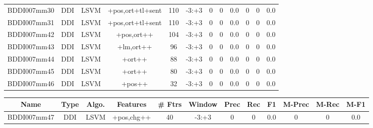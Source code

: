 \documentclass[a4paper]{article}
\begin{document}
\begin{landscape}
\begin{center}
\begin{tabular}{ |c|c|c|c|c|c|c|c|c|c|c|c|}
 
 	
 	\small{ BDDI007mm30 } & \small{ DDI} & \small{  LSVM }  & +pos,ort+tl+sent  &  110 &  \small{  -3:+3 }  &  0 & 0 & 0.0  &  0 & 0 & 0.0 \\
 	

 
 	
 	\small{ BDDI007mm31 } & \small{ DDI} & \small{  LSVM }  & +pos,ort+tl+sent  &  110 &  \small{  -3:+3 }  &  0 & 0 & 0.0  &  0 & 0 & 0.0 \\
 	

 
 	
 	\small{ BDDI007mm42 } & \small{ DDI} & \small{  LSVM }  & +pos,ort++  &  104 &  \small{  -3:+3 }  &  0 & 0 & 0.0  &  0 & 0 & 0.0 \\
 	

 
 	
 	\small{ BDDI007mm43 } & \small{ DDI} & \small{  LSVM }  & +lm,ort++  &  96 &  \small{  -3:+3 }  &  0 & 0 & 0.0  &  0 & 0 & 0.0 \\
 	

 
 	
 	\small{ BDDI007mm44 } & \small{ DDI} & \small{  LSVM }  & +ort++  &  88 &  \small{  -3:+3 }  &  0 & 0 & 0.0  &  0 & 0 & 0.0 \\
 	

 
 	
 	\small{ BDDI007mm45 } & \small{ DDI} & \small{  LSVM }  & +ort++  &  80 &  \small{  -3:+3 }  &  0 & 0 & 0.0  &  0 & 0 & 0.0 \\
 	

 
 	
 	\small{ BDDI007mm46 } & \small{ DDI} & \small{  LSVM }  & +pos++  &  32 &  \small{  -3:+3 }  &  0 & 0 & 0.0  &  0 & 0 & 0.0 \\
 	
 \hline
\end{tabular}
\end{center}




\begin{center}
\begin{tabular}{ |c|c|c|c|c|c|c|c|c|c|c|c|} 
 \hline
 	Name & Type & Algo. & Features & \# Ftrs & Window & Prec & Rec & F1 & M-Prec & M-Rec & M-F1\\
 \hline

 	

 
 	
 	\small{ BDDI007mm47 } & \small{ DDI} & \small{  LSVM }  & +pos,chg++  &  40 &  \small{  -3:+3 }  &  0 & 0 & 0.0  &  0 & 0 & 0.0 \\
 	


\end{tabular}
\end{center}
\end{landscape}
\end{document}
